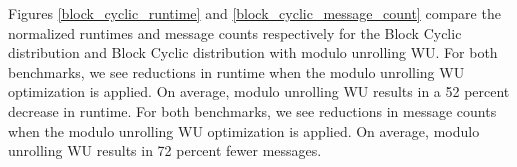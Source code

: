 Figures \ref{block_cyclic_runtime} and \ref{block_cyclic_message_count} compare the normalized runtimes and message counts respectively for the Block Cyclic distribution and Block Cyclic distribution with modulo unrolling WU. For both benchmarks, we see reductions in runtime when the modulo unrolling WU optimization is applied. On average, modulo unrolling WU results in a 52 percent decrease in runtime. For both benchmarks, we see reductions in message counts when the modulo unrolling WU optimization is applied. On average, modulo unrolling WU results in 72 percent fewer messages. 